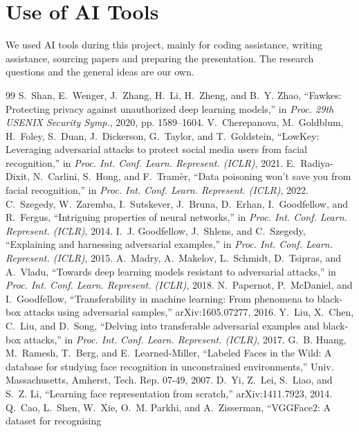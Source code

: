 \documentclass[conference]{IEEEtran}
\begin{document}
\section*{Use of AI Tools}
We used AI tools during this project, mainly for coding assistance, writing assistance, sourcing papers and
preparing the presentation. The research questions and the general ideas are our own.


\FloatBarrier
\begin{thebibliography}{99}
 S.~Shan, E.~Wenger, J.~Zhang, H.~Li, H.~Zheng, and B.~Y. Zhao, ``Fawkes: Protecting privacy
against unauthorized deep learning models,'' in \emph{Proc. 29th USENIX Security Symp.}, 2020, pp. 1589--1604.
 V.~Cherepanova, M.~Goldblum, H.~Foley, S.~Duan, J.~Dickerson, G.~Taylor, and T.~Goldstein,
``LowKey: Leveraging adversarial attacks to protect social media users from facial recognition,'' in \emph{Proc.
Int. Conf. Learn. Represent. (ICLR)}, 2021.
 E.~Radiya-Dixit, N.~Carlini, S.~Hong, and F.~Tram\`er, ``Data poisoning won't save you from facial
recognition,'' in \emph{Proc. Int. Conf. Learn. Represent. (ICLR)}, 2022.
 C.~Szegedy, W.~Zaremba, I.~Sutskever, J.~Bruna, D.~Erhan, I.~Goodfellow, and R.~Fergus,
``Intriguing properties of neural networks,'' in \emph{Proc. Int. Conf. Learn. Represent. (ICLR)}, 2014.
 I.~J. Goodfellow, J.~Shlens, and C.~Szegedy, ``Explaining and harnessing adversarial examples,'' in
\emph{Proc. Int. Conf. Learn. Represent. (ICLR)}, 2015.
 A.~Madry, A.~Makelov, L.~Schmidt, D.~Tsipras, and A.~Vladu, ``Towards deep learning models resistant
to adversarial attacks,'' in \emph{Proc. Int. Conf. Learn. Represent. (ICLR)}, 2018.
 N.~Papernot, P.~McDaniel, and I.~Goodfellow, ``Transferability in machine learning: From
phenomena to black-box attacks using adversarial samples,'' arXiv:1605.07277, 2016.
 Y.~Liu, X.~Chen, C.~Liu, and D.~Song, ``Delving into transferable adversarial examples and
black-box attacks,'' in \emph{Proc. Int. Conf. Learn. Represent. (ICLR)}, 2017.
 G.~B. Huang, M.~Ramesh, T.~Berg, and E.~Learned-Miller, ``Labeled Faces in the Wild: A database for
studying face recognition in unconstrained environments,'' Univ. Massachusetts, Amherst, Tech. Rep. 07-49, 2007.
 D.~Yi, Z.~Lei, S.~Liao, and S.~Z. Li, ``Learning face representation from scratch,''
arXiv:1411.7923, 2014.
 Q.~Cao, L.~Shen, W.~Xie, O.~M. Parkhi, and A.~Zisserman, ``VGGFace2: A dataset for recognising

\end{thebibliography}
\end{document}
